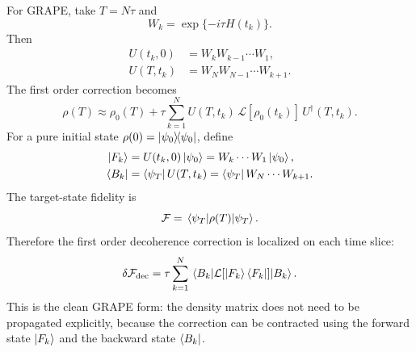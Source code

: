 \documentclass{notes2}
\begin{document}
For GRAPE, take $T=N\tau$ and
\begin{equation}
    W_k = \exp\{-i\tau H(t_k)\}.
\end{equation}
Then
\begin{align}
    U(t_k,0) &= W_k W_{k-1}\cdots W_1,\\
    U(T,t_k) &= W_N W_{N-1}\cdots W_{k+1}.
\end{align}
The first order correction becomes
\begin{equation}
    \rho(T)
    \approx
    \rho_0(T)
    +
    \tau
    \sum_{k=1}^{N}
    U(T,t_k)\,
    \mathcal{L}[\rho_0(t_k)]\,
    U^\dagger(T,t_k).
    \label{eq:discrete_lindblad_correction}
\end{equation}
For a pure initial state $\rho(0)=\ketbra{\psi_0}$, define
\begin{align}
    \ket{F_k}
    &=
    U(t_k,0)\ket{\psi_0}
    =
    W_k\cdots W_1\ket{\psi_0},
    \\
    \bra{B_k}
    &=
    \bra{\psi_T}U(T,t_k)
    =
    \bra{\psi_T}W_N\cdots W_{k+1}.
\end{align}
The target-state fidelity is
\begin{equation}
    \mathcal{F}
    =
    \mel{\psi_T}{\rho(T)}{\psi_T}.
\end{equation}
Therefore the first order decoherence correction is localized on each time
slice:
\begin{equation}
    \delta \mathcal{F}_{\mathrm{dec}}
    =
    \tau
    \sum_{k=1}^{N}
    \mel{B_k}{
        \mathcal{L}[\ket{F_k}\bra{F_k}]
    }{B_k}.
    \label{eq:decoherence_fidelity_correction}
\end{equation}
This is the clean GRAPE form: the density matrix does not need to be
propagated explicitly, because the correction can be contracted using the
forward state $\ket{F_k}$ and the backward state $\bra{B_k}$.
\end{document}
